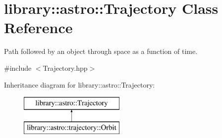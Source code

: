 \hypertarget{classlibrary_1_1astro_1_1_trajectory}{}\section{library\+:\+:astro\+:\+:Trajectory Class Reference}
\label{classlibrary_1_1astro_1_1_trajectory}


Path followed by an object through space as a function of time.  




{\ttfamily \#include $<$Trajectory.\+hpp$>$}

Inheritance diagram for library\+:\+:astro\+:\+:Trajectory\+:\begin{figure}[H]
\begin{center}
\leavevmode
\includegraphics[height=2.000000cm]{classlibrary_1_1astro_1_1_trajectory}
\end{center}
\end{figure}
